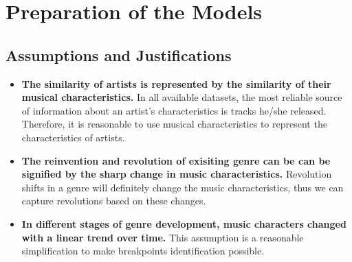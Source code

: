 \documentclass[12pt]{article}  %
\begin{document}
	
	
	
	
	\section{Preparation of the Models}
	\subsection{Assumptions and Justifications}
	\begin{itemize}
		\setlength{\parsep}{0ex} %
		\setlength{\topsep}{2ex} %
		\setlength{\itemsep}{1ex} %
		\item \textbf{The similarity of artists is represented by the similarity of their musical characteristics.} In all available datasets, the most reliable source of information about an artist's characteristics is tracks he/she released. Therefore, it is reasonable to use musical characteristics to represent the characteristics of artists.
		\item  \textbf{The reinvention and revolution of exisiting genre can be can be signified by the sharp change in music characteristics.} Revolution shifts in a genre will definitely change the
		music characteristics, thus we can capture revolutions based on these changes. 
		\item \textbf{In different stages of genre development, music characters changed with a linear trend over time.} This assumption is a reasonable simplification to make breakpoints identification possible. 
	\end{itemize}
	
\end{document}
